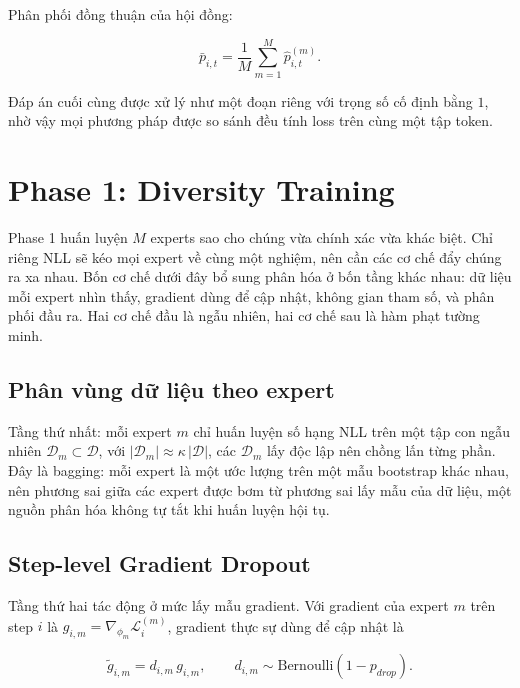 \documentclass[12pt,a4paper]{article}
\begin{document}
Phân phối đồng thuận của hội đồng:

\begin{equation}
\label{eq:pbar}
\bar{p}_{i,t} = \frac{1}{M}\sum_{m=1}^{M}\hat{p}_{i,t}^{(m)}.
\end{equation}

Đáp án cuối cùng được xử lý như một đoạn riêng với trọng số cố định bằng $1$, nhờ vậy mọi phương pháp được so sánh đều tính loss trên cùng một tập token.

\section{Phase 1: Diversity Training}
\label{sec:phase1}

Phase 1 huấn luyện $M$ experts sao cho chúng vừa chính xác vừa khác biệt. Chỉ riêng NLL sẽ kéo mọi expert về cùng một nghiệm, nên cần các cơ chế đẩy chúng ra xa nhau. Bốn cơ chế dưới đây bổ sung phân hóa ở bốn tầng khác nhau: dữ liệu mỗi expert nhìn thấy, gradient dùng để cập nhật, không gian tham số, và phân phối đầu ra. Hai cơ chế đầu là ngẫu nhiên, hai cơ chế sau là hàm phạt tường minh.

\subsection{Phân vùng dữ liệu theo expert}
\label{sec:partition}

Tầng thứ nhất: mỗi expert $m$ chỉ huấn luyện số hạng NLL trên một tập con ngẫu nhiên $\mathcal{D}_m \subset \mathcal{D}$, với $|\mathcal{D}_m| \approx \kappa\,|\mathcal{D}|$, các $\mathcal{D}_m$ lấy độc lập nên chồng lấn từng phần. Đây là bagging: mỗi expert là một ước lượng trên một mẫu bootstrap khác nhau, nên phương sai giữa các expert được bơm từ phương sai lấy mẫu của dữ liệu, một nguồn phân hóa không tự tắt khi huấn luyện hội tụ.

\subsection{Step-level Gradient Dropout}

Tầng thứ hai tác động ở mức lấy mẫu gradient. Với gradient của expert $m$ trên step $i$ là $g_{i,m} = \nabla_{\phi_m}\mathcal{L}_i^{(m)}$, gradient thực sự dùng để cập nhật là

\begin{equation}
\label{eq:graddropout}
\tilde{g}_{i,m} = d_{i,m}\, g_{i,m},
\qquad
d_{i,m} \sim \mathrm{Bernoulli}(1-p_{drop}).
\end{equation}
\end{document}
